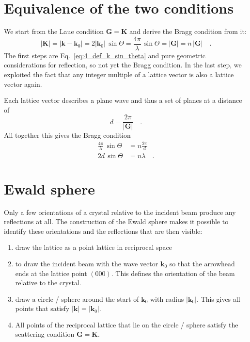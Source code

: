 \section{Equivalence of the two conditions}

We start from the Laue condition $\mathbf{G} = \mathbf{K}$ and derive the Bragg condition from it:
\begin{equation}
 | \mathbf{K} | = |\mathbf{k} - \mathbf{k}_0| = 2 | \mathbf{k}_0| \, \sin \Theta = \frac{4 \pi}{ \lambda} \, \sin \Theta = | \mathbf{G} | = n \, | \mathbf{G} | \quad .
\end{equation}
The first steps are Eq.~\ref{eq:4_def_k_sin_theta} and pure geometric considerations for reflection, so not yet the Bragg condition. In the last step, we exploited the fact that any integer multiple of a lattice vector is also a lattice vector again.

Each lattice vector describes a plane wave and thus a set of planes at a distance of 
\begin{equation}
 d = \frac{2 \pi}{|\mathbf{G} | }  \quad .
\end{equation}
 All together this gives the Bragg condition
 \begin{align}
   \frac{4 \pi}{ \lambda} \, \sin \Theta & = n \frac{2 \pi}{d } \\
   2 d \, \sin \Theta & = n \lambda \quad .
 \end{align}
 

\section{Ewald sphere} 
Only a few orientations of a crystal relative to the incident beam produce any reflections at all. The construction of the Ewald sphere makes it possible to identify these orientations and the reflections that are then visible:
\begin{enumerate} \setlength{\itemsep}{0pt}
\item draw the lattice as a point lattice in reciprocal space

\item to draw the incident beam with the wave vector $\mathbf{k}_0$ so that the arrowhead ends at the lattice point $(000)$. This defines the orientation of the beam relative to the crystal.

\item draw a circle / sphere around the start of $\mathbf{k}_0$ with radius $|\mathbf{k}_0|$. This gives all points that satisfy $|\mathbf{k}| = |\mathbf{k}_0|$.

\item All points of the reciprocal lattice that lie on the circle / sphere satisfy the scattering condition $\mathbf{G} =\mathbf{K} $.
\end{enumerate}


